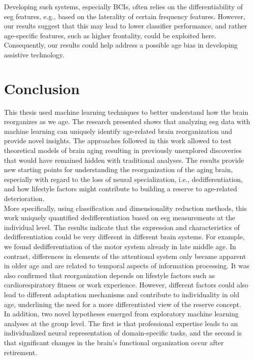 Developing such systems, especially BCIs, often relies on the differentiability of \gls{eeg} features, e.g., based on the laterality of certain frequency features. However, our results suggest that this may lead to lower classifier performance, and rather age-specific features, such as higher frontality, could be exploited here. Consequently, our results could help address a possible age bias in developing assistive technology.

\section{Conclusion}
This thesis used machine learning techniques to better understand how the brain reorganizes as we age. The research presented shows that analyzing \gls{eeg} data with machine learning can uniquely identify age-related brain reorganization and provide novel insights. The approaches followed in this work allowed to test theoretical models of brain aging resulting in previously unexplored discoveries that would have remained hidden with traditional analyses. The results provide new starting points for understanding the reorganization of the aging brain, especially with regard to the loss of neural specialization, i.e., dedifferentiation, and how lifestyle factors might contribute to building a reserve to age-related deterioration.\\
More specifically, using classification and dimensionality reduction methods, this work uniquely quantified dedifferentiation based on \gls{eeg} measurements at the individual level. The results indicate that the expression and characteristics of dedifferentiation could be very different in different brain systems. For example, we found dedifferentiation of the motor system already in late middle age. In contrast, differences in elements of the attentional system only became apparent in older age and are related to temporal aspects of information processing. It was also confirmed that reorganization depends on lifestyle factors such as cardiorespiratory fitness or work experience. However, different factors could also lead to different adaptation mechanisms and contribute to individuality in old age, underlining the need for a more differentiated view of the reserve concept.\\
In addition, two novel hypotheses emerged from exploratory machine learning analyses at the group level. The first is that professional expertise leads to an individualized neural representation of domain-specific tasks, and the second is that significant changes in the brain's functional organization occur after retirement.\\
